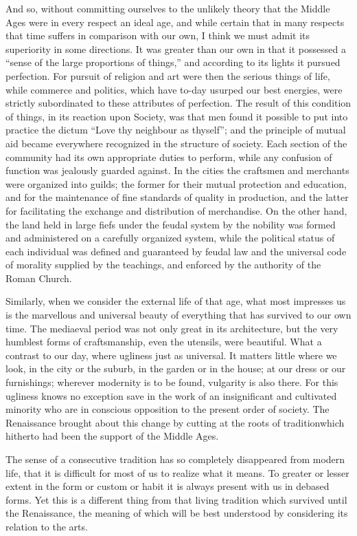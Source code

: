 \documentclass{book}
\begin{document}
And so, without committing ourselves to the unlikely theory that the Middle Ages were in every respect an ideal age, and while certain that in many respects that time suffers in comparison with our own, I think we must admit its superiority in some directions. It was greater than our own in that it possessed a “sense of the large proportions of things,” and according to its lights it pursued perfection. For pursuit of religion and art were then the serious things of life, while commerce and politics, which have to-day usurped our best energies, were strictly subordinated to these attributes of perfection. The result of this condition of things, in its reaction upon Society, was that men found it possible to put into practice the dictum “Love thy neighbour as thyself”; and the principle of mutual aid became everywhere recognized in the structure of society. Each section of the community had its own appropriate duties to perform, while any confusion of function was jealously guarded against. In the cities the craftsmen and merchants were organized into guilds; the former for their mutual protection and education, and for the maintenance of fine standards of quality in production, and the latter for facilitating the exchange and distribution of merchandise. On the other hand, the land held in large fiefs under the feudal system by the nobility was formed and administered on a carefully organized system, while the political status of each individual was defined and guaranteed by feudal law and the universal code of morality supplied by the teachings, and enforced by the authority of the Roman Church.

Similarly, when we consider the external life of that age, what most impresses us is the marvellous and universal beauty of everything that has survived to our own time. The mediaeval period was not only great in its architecture, but the very humblest forms of craftsmanship, even the utensils, were beautiful. What a contrast to our day, where ugliness just as universal. It matters little where we look, in the city or the suburb, in the garden or in the house; at our dress or our furnishings; wherever modernity is to be found, vulgarity is also there. For this ugliness knows no exception save in the work of an insignificant and cultivated minority who are in conscious opposition to the present order of society. The Renaissance brought about this change by cutting at the roots of tradition\footnotemark[1] which hitherto had been the support of the Middle Ages.

The sense of a consecutive tradition has so completely disappeared from modern life, that it is difficult for most of us to realize what it means. To greater or lesser extent in the form or custom or habit it is always present with us in debased forms. Yet this is a different thing from that living tradition which survived until the Renaissance, the meaning of which will be best understood by considering its relation to the arts.
\end{document}
